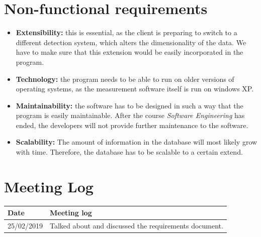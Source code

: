 \documentclass{article}
\begin{document}
\section{Non-functional requirements}
\begin{itemize}
	\item \textbf{Extensibility:} this is essential, as the client is preparing to switch to a different detection system, which alters the dimensionality of the data. We have to make sure that this extension would be easily incorporated in the program. 
	\item \textbf{Technology:} the program needs to be able to run on older versions of operating systems, as the measurement software itself is run on windows XP. 
	\item \textbf{Maintainability: } the software has to be designed in such a way that the program is easily  maintainable. After the course \textit{Software Engineering} has ended, the developers will not provide further maintenance to the software. 
	\item \textbf{Scalability: } The amount of information in the database will most likely grow with time. Therefore, the database has to be scalable to a certain extend. 
\end{itemize}


\section{Meeting Log}
\begin{center}
 \begin{tabular}{ | l | l | }
  \hline
  \bf{Date} & \bf{Meeting log} \\
  \hline
  25/02/2019 & Talked about and discussed the requirements document. \\
  \hline
 \end{tabular}
\end{center}

\end{document}
